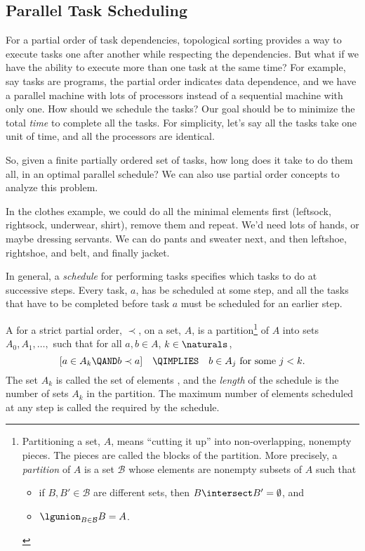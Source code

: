 \subsection{Parallel Task Scheduling}

For a partial order of task dependencies, topological sorting provides
a way to execute tasks one after another while respecting the
dependencies.  But what if we have the ability to execute more than
one task at the same time?  For example, say tasks are programs, the
partial order indicates data dependence, and we have a parallel
machine with lots of processors instead of a sequential machine with
only one.  How should we schedule the tasks?  Our goal should be to
minimize the total \emph{time} to complete all the tasks.  For
simplicity, let's say all the tasks take one unit of time, and all the
processors are identical.

So, given a finite partially ordered set of tasks, how long does it take
to do them all, in an optimal parallel schedule?  We can also use partial
order concepts to analyze this problem.

In the clothes example, we could do all the minimal elements first
(leftsock, rightsock, underwear, shirt), remove them and repeat.  We'd need
lots of hands, or maybe dressing servants.  We can do pants and sweater
next, and then leftshoe, rightshoe, and belt, and finally jacket.

In general, a \emph{schedule} for performing tasks specifies which
tasks to do at successive steps.  Every task, $a$, has be scheduled at
some step, and all the tasks that have to be completed before task $a$
must be scheduled for an earlier step.

\begin{definition}\label{def:schedule}
A  for a strict partial order, $\prec$, on a set,
$A$, is a partition\footnote{Partitioning a set,
$A$, means ``cutting it up'' into non-overlapping, nonempty pieces.  The
pieces are called the blocks of the partition.  More precisely, a
\emph{partition} of $A$ is a set $\mathcal{B}$ whose elements are nonempty
subsets of $A$ such that
\begin{itemize}
\item if $B,B' \in \mathcal{B}$ are different sets, then $B \intersect B' =
 \emptyset$, and
\item $\lgunion_{B\in \mathcal{B}} B = A$.
\end{itemize}} of $A$ into sets $A_0, A_1,\dots,$ such
that for all $a,b \in A$, $k \in \naturals$,
\[
[a \in A_k \QAND b \prec a] \quad\QIMPLIES\quad b \in A_j \text{ for some } j < k.
\]
The set $A_k$ is called the set of elements , and the \emph{length} of the schedule is the number of sets
$A_k$ in the partition.  The maximum number of elements scheduled at
any step is called the  required by the
schedule.
\end{definition}

